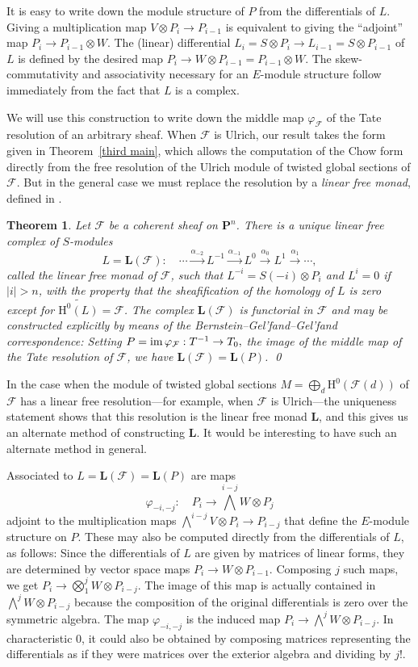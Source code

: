 \documentclass{jams-l}
\newtheorem{theorem}{Theorem}[section]
\theoremstyle{definition}
\theoremstyle{remark}
\newcommand{\F}{{\mathcal F}}
\newcommand{\Hrm}{{\mathrm H}}
\newcommand{\LL}{{\mathbf L}}
\newcommand{\PP}{{\mathbf P}}
\newcommand{\im}{\mathop{\rm im}}
\newcommand{\rTo}{\xrightarrow}
\newcommand{\rTox}{\rightarrow}
\begin{document}
It is easy to write down the module structure of $P$ from
the differentials of $L$. Giving a multiplication map
$V\otimes P_i\to P_{i-1}$ is equivalent
to giving the ``adjoint'' map $P_i\to P_{i-1}\otimes W$.
The (linear) differential
$L_i=S\otimes P_i \to L_{i-1}=S\otimes P_{i-1}$ of $L$ is defined
by the desired map $P_i\to W\otimes P_{i-1} = P_{i-1}\otimes W$.
The skew-commutativity and associativity necessary for an $E$-module 
structure follow immediately from the fact that $L$ is a complex.

We will use this construction to write down the middle
map
$\varphi_\F$ of the Tate resolution of an arbitrary sheaf. 
When $\F$ is Ulrich, our result takes the form given in Theorem~\ref{third main},
which allows the computation of the Chow form directly from the
free resolution of the Ulrich module of twisted global sections of $\F$.
But in the general case we must replace the
resolution by a {\it linear free monad\/}, defined
in \cite[Example 8.5 and Proposition 8.6]{Eisenbudetal.2001}.

\begin{theorem}\label{lin free monad} Let $\F$ be a 
\label{chow of Ulrich}
coherent sheaf on $\PP^n$. There
is a unique linear free complex of $S$-modules
\[
L=\LL(\F):\quad \cdots 
\rTo{\alpha_{-2}} L^{-1}\rTo{\alpha_{-1}}
L^0\rTo{\alpha_0} L^1\rTo{\alpha_1}
\cdots ,
\]
called the linear free monad of $\F$, 
such that  $L^{-i}=S(-i)\otimes P_i$
and $L^i=0$ if $|i|>n$,
with the property that the sheafification of the 
homology of $L$ is zero except for $\widetilde{\Hrm^0(L)} = \F$.
The complex $\LL(\F)$ 
is functorial in $\F$ and may be
constructed explicitly by means
of the Bernstein--Gel'fand--Gel'fand correspondence: Setting
$P=\im \varphi_\F: T^{-1}\rTox T_0,$ 
the image of the middle map
of the Tate resolution of $\F$,
we have  
$\LL(\F)=\LL(P)$.
\qed
\end{theorem}

In the case when the module of
twisted global sections
$M=\bigoplus_d\Hrm^0(\F(d))$ of $\F$ has a linear free
resolution---for example, when $\F$ is 
Ulrich---the uniqueness statement shows that this
resolution is the linear free monad $\LL$, and this gives us
an alternate method of constructing $\LL$. It would be
interesting to have such an alternate method in general.

Associated to $L=\LL(\F) = \LL(P)$ are maps
\[
\varphi_{-i,-j}:\quad P_i\to\bigwedge^{i-j}W\otimes P_j
\]
adjoint to the multiplication maps $\bigwedge^{i-j}V\otimes P_i \to P_{i-j}$
that define the $E$-module structure on $P$. These may also
be computed directly from the differentials of $L$, as follows:
Since the differentials of $L$ are given by matrices of linear forms, they
are determined by vector space maps $P_i\to W\otimes P_{i-1}$.
Composing $j$ such maps, we get $P_i\to \bigotimes_1^jW \otimes P_{i-j}$.
The image of this map is actually contained in 
$\bigwedge^jW \otimes P_{i-j}$ because the composition of the original
differentials is zero over the symmetric algebra. 
The map $\varphi_{-i,-j}$ is the induced map 
$P_i\to \bigwedge^jW \otimes P_{i-j}$. In characteristic 0, it could
also be obtained by composing matrices representing the differentials
as if they were matrices over the exterior algebra and dividing by $j!$.
\end{document}
